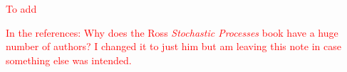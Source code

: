 \documentclass[11pt]{article}
\newcommand{\cA}{{\cal A}}
\newcommand{\cQ}{{\cal Q}}
\newcommand{\st}{\mbox{s.t.}}
\renewcommand{\underbar}{\underaccent{\bar}}
\newcommand{\tcr}{\textcolor{red}}
\begin{document}
\tcr{To add}

\tcr{In the references: Why does the Ross {\em Stochastic Processes} book have a huge number of authors? I changed it to just him but am leaving this note in case something else was intended.}

	



\pagebreak

\appendix

\end{document}

